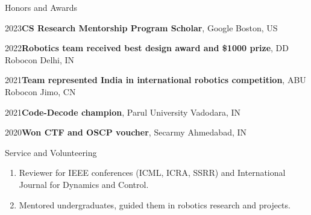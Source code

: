 \documentclass{resume}
\begin{document}





\begin{rSection}{Honors and Awards} 

{2023\hspace{1em}}{\bf CS Research Mentorship Program Scholar}{, Google} \hfill Boston, US \vspace{-0.5em}

{2022\hspace{1em}}{\bf Robotics team received best design award and \$1000 prize}{, DD Robocon} \hfill Delhi, IN \vspace{-0.5em}

{2021\hspace{1em}}{\bf Team represented India in international robotics competition}{, ABU Robocon} \hfill Jimo, CN \vspace{-0.5em}

{2021\hspace{1em}}{\bf Code-Decode champion}{, Parul University} \hfill Vadodara, IN \vspace{-0.5em}

{2020\hspace{1em}}{\bf Won CTF and OSCP voucher}{, Secarmy} \hfill Ahmedabad, IN \vspace{-0.5em}


\end{rSection}

\begin{rSection}{Service and Volunteering}
 
\begin{enumerate}
    \item Reviewer for IEEE conferences (ICML, ICRA, SSRR) and International Journal for Dynamics and Control.
    \item Mentored undergraduates, guided them in robotics research and projects.
\end{enumerate}
\end{rSection}
\end{document}
